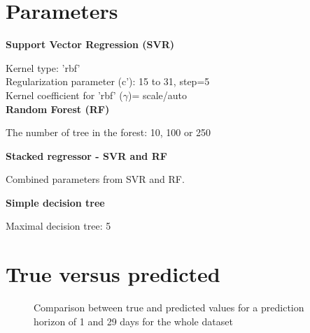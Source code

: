 \section{Parameters}
\label{sec:Parameters}
\noindent
\textbf{Support Vector Regression (SVR)}

\noindent
Kernel type: 'rbf' \\
Regularization parameter (c'): 15 to 31, step=5\\
Kernel coefficient for 'rbf' ($\gamma$)= scale/auto\\

\noindent
\textbf{Random Forest (RF)}

\noindent
The number of tree in the forest: 10, 100 or 250

\noindent
\textbf{Stacked regressor - SVR and RF}

\noindent
Combined parameters from SVR and RF.

\noindent
\textbf{Simple decision tree}

\noindent
Maximal decision tree: 5

\section{True versus predicted}
\label{sec:TrueVersusPredicted}

\begin{figure}[htbp]
  \centering
  
  \caption{Comparison between true and predicted values for a prediction horizon of 1 and 29 days for the whole dataset}
  \label{fig:StackedComparissonFullData}
\end{figure}